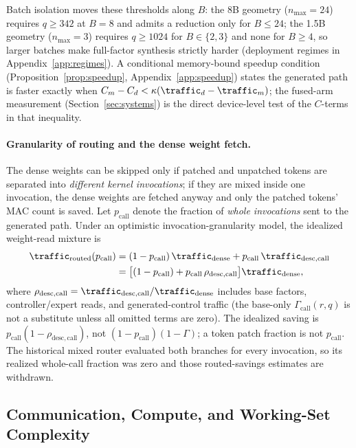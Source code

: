 Batch isolation moves these thresholds along $B$: the 8B geometry
($n_{\max}=24$) requires $q\ge342$ at $B=8$ and admits a reduction only for
$B\le24$; the 1.5B geometry ($n_{\max}=3$) requires $q\ge1024$ for
$B\in\{2,3\}$ and none for $B\ge4$, so larger batches make full-factor
synthesis strictly harder (deployment regimes in Appendix~\ref{app:regimes}).
A conditional memory-bound speedup condition (Proposition~\ref{prop:speedup},
Appendix~\ref{app:speedup}) states the generated path is faster exactly when
$C_m-C_d<\kappa(\traffic_d-\traffic_m)$; the fused-arm measurement
(Section~\ref{sec:systems}) is the direct device-level test of the
$C$-terms in that inequality.

\paragraph{Granularity of routing and the dense weight fetch.}
The dense weights can be skipped only if patched and unpatched tokens are
separated into \emph{different kernel invocations}; if they are mixed inside
one invocation, the dense weights are fetched anyway and only the patched
tokens' MAC count is saved. Let $p_{\mathrm{call}}$ denote the fraction of
\emph{whole invocations} sent to the generated path. Under an optimistic
invocation-granularity model, the idealized weight-read mixture is
\begin{align}
\label{eq:routedtraffic}
\traffic_{\mathrm{routed}}(p_{\mathrm{call}})
&= (1-p_{\mathrm{call}})\,\traffic_{\mathrm{dense}}
  + p_{\mathrm{call}}\,\traffic_{\mathrm{desc,call}}\nonumber\\
&= \bigl[(1-p_{\mathrm{call}})
  + p_{\mathrm{call}}\,\rho_{\mathrm{desc,call}}\bigr]
  \traffic_{\mathrm{dense}},
\end{align}
where $\rho_{\mathrm{desc,call}}=\traffic_{\mathrm{desc,call}}/
\traffic_{\mathrm{dense}}$ includes base factors, controller/expert reads,
and generated-control traffic (the base-only $\Gamma_{\mathrm{call}}(r,q)$ is
not a substitute unless all omitted terms are zero). The idealized saving is
$p_{\mathrm{call}}(1-\rho_{\mathrm{desc,call}})$, not
$(1-p_{\mathrm{call}})(1-\Gamma)$; a token patch fraction is not
$p_{\mathrm{call}}$. The historical mixed router evaluated both branches for
every invocation, so its realized whole-call fraction was zero and those
routed-savings estimates are withdrawn.


\subsection{Communication, Compute, and Working-Set Complexity}
\label{sec:complexity}

